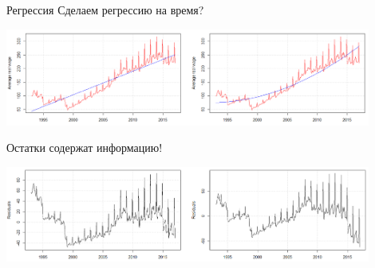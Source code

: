 \documentclass[10pt,pdf,utf8,hyperref={unicode},aspectratio=169]{beamer}
\begin{document}
\begin{frame}{Регрессия}
	Сделаем регрессию на время?
	\begin{center}
		\includegraphics[width=0.9\textwidth]{wage1.png}
	\end{center}		
	
	Остатки содержат информацию!
	\begin{center}
		\includegraphics[width=0.9\textwidth]{wage2.png}
	\end{center}			
\end{frame}
\end{document}
